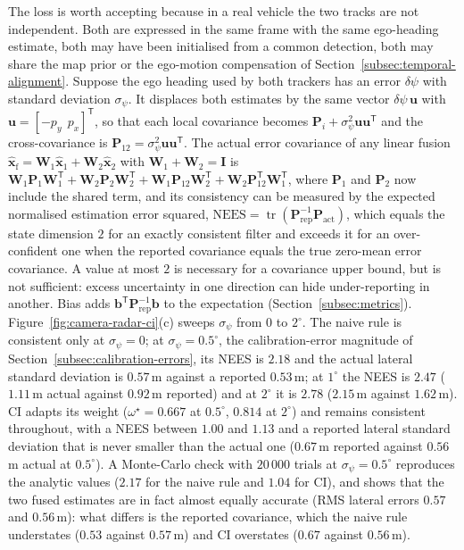 \documentclass[graybox,envcountchap]{style/SNmono}
\DeclareMathOperator{\tr}{tr}
\providecommand{\DIFadd}[1]{{\protect\color{blue} #1}} %
\providecommand{\DIFdel}[1]{{\protect\color{red} #1}} %
\providecommand{\DIFaddbegin}{} %
\providecommand{\DIFaddend}{} %
\providecommand{\DIFdelbegin}{} %
\providecommand{\DIFdelend}{} %
\begin{document}
\begin{example}
The loss is worth accepting because in a real vehicle the two tracks are not independent. Both are expressed in the same frame with the same ego-heading estimate, both may have been initialised from a common detection, both may share the map prior or the ego-motion compensation of Section~\ref{subsec:temporal-alignment}. Suppose the ego heading used by both trackers has an error $\delta\psi$ with standard deviation $\sigma_{\psi}$. It displaces both estimates by the same vector $\delta\psi\,\mathbf{u}$ with $\mathbf{u}=[-p_{y}\ \ p_{x}]^{\mathsf T}$, so that each local covariance becomes $\mathbf{P}_{i}+\sigma_{\psi}^{2}\mathbf{u}\mathbf{u}^{\mathsf T}$ and the cross-covariance is $\mathbf{P}_{12}=\sigma_{\psi}^{2}\mathbf{u}\mathbf{u}^{\mathsf T}$. The actual error covariance of any linear fusion $\widehat{\mathbf{x}}_{\mathrm{f}}=\mathbf{W}_{1}\widehat{\mathbf{x}}_{1}+\mathbf{W}_{2}\widehat{\mathbf{x}}_{2}$ with $\mathbf{W}_{1}+\mathbf{W}_{2}=\mathbf{I}$ is $\mathbf{W}_{1}\mathbf{P}_{1}\mathbf{W}_{1}^{\mathsf T}+\mathbf{W}_{2}\mathbf{P}_{2}\mathbf{W}_{2}^{\mathsf T}+\mathbf{W}_{1}\mathbf{P}_{12}\mathbf{W}_{2}^{\mathsf T}+\mathbf{W}_{2}\mathbf{P}_{12}^{\mathsf T}\mathbf{W}_{1}^{\mathsf T}$, where $\mathbf{P}_{1}$ and $\mathbf{P}_{2}$ now include the shared term, and its consistency can be measured by the expected normalised estimation error squared, $\mathrm{NEES}=\tr(\mathbf{P}_{\mathrm{rep}}^{-1}\mathbf{P}_{\mathrm{act}})$, which equals the state dimension $2$ \DIFdelbegin \DIFdel{for an exactly consistent filter and exceeds it for an over-confident one }\DIFdelend \DIFaddbegin \DIFadd{when the reported covariance equals the true zero-mean error covariance. A value at most $2$ is necessary for a covariance upper bound, but is not sufficient: excess uncertainty in one direction can hide under-reporting in another. Bias adds $\mathbf{b}^{\mathsf T}\mathbf{P}_{\mathrm{rep}}^{-1}\mathbf{b}$ to the expectation }\DIFaddend (Section~\ref{subsec:metrics}). Figure~\ref{fig:camera-radar-ci}(c) sweeps $\sigma_{\psi}$ from $0$ to $2^{\circ}$. The naive rule is consistent only at $\sigma_{\psi}=0$; at $\sigma_{\psi}=0.5^{\circ}$, the calibration-error magnitude of Section~\ref{subsec:calibration-errors}, its NEES is $2.18$ and the actual lateral standard deviation is $0.57$\,m against a reported $0.53$\,m; at $1^{\circ}$ the NEES is $2.47$ ($1.11$\,m actual against $0.92$\,m reported) and at $2^{\circ}$ it is $2.78$ ($2.15$\,m against $1.62$\,m). CI adapts its weight ($\omega^{\star}=0.667$ at $0.5^{\circ}$, $0.814$ at $2^{\circ}$) and remains consistent throughout, with a NEES between $1.00$ and $1.13$ and a reported lateral standard deviation that is never smaller than the actual one ($0.67$\,m reported against $0.56$\,m actual at $0.5^{\circ}$). A Monte-Carlo check with $20\,000$ trials at $\sigma_{\psi}=0.5^{\circ}$ reproduces the analytic values ($2.17$ for the naive rule and $1.04$ for CI), and shows that the two fused estimates are in fact almost equally accurate (RMS lateral errors $0.57$ and $0.56$\,m): what differs is the reported covariance, which the naive rule understates ($0.53$ against $0.57$\,m) and CI overstates ($0.67$ against $0.56$\,m).


\end{example}
\end{document}
